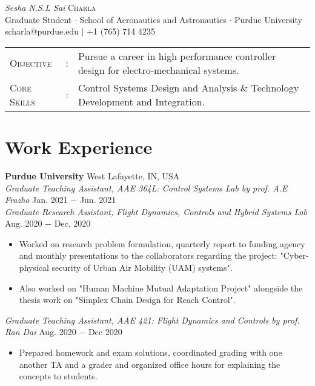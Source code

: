 \documentclass[letterpaper,10pt]{article}
\begin{document}
\begin{center}
\thispagestyle{empty}
\huge{\textit{Sesha N.S.L Sai} \textsc{Charla}}\\
\small Graduate Student $\cdot$ School of Aeronautics and Astronautics $\cdot$ Purdue University\\
\small scharla@purdue.edu $\mid$ +1 (765) 714 4235   \\
\end{center}



\begin{tabular}{l c l}
    {\large{\textsc{Objective}}}&:& Pursue a career in high performance controller design for electro-mechanical systems.\\
	{\large{\textsc{Core Skills}}}&:& Control Systems Design and Analysis \& Technology Development and Integration. %
\end{tabular}


\section{Work Experience}
\noindent \textbf{Purdue University} \hfill West Lafayette, IN, USA \\
\noindent \textit{Graduate Teaching Assistant, AAE 364L: Control Systems Lab by prof. A.E Frazho} \hfill Jan. 2021 $-$ Jun. 2021\\
\vspace{3pt}
\noindent \textit{Graduate Research Assistant, Flight Dynamics, Controls and Hybrid Systems Lab} \hfill Aug. 2020 $-$ Dec. 2020
\begin{itemize}[noitemsep,nolistsep,leftmargin=0.25in,label={--}]
    \item Worked on research problem formulation, quarterly report to funding agency and monthly presentations to the collaborators regarding the project: "Cyber-physical security of Urban Air Mobility (UAM) systems".
	 \item Also worked on "Human Machine Mutual Adaptation Project" alongside the thesis work on "Simplex Chain Design for Reach Control".
\end{itemize}
\vspace{3pt}
\noindent \textit{Graduate Teaching Assistant, AAE 421: Flight Dynamics and Controls by prof. Ran Dai} \hfill Aug. 2020 $-$ Dec 2020
\begin{itemize}[noitemsep,nolistsep,leftmargin=0.25in,label={--}]
    \item Prepared homework and exam solutions, coordinated grading with one another TA and a grader and organized office hours for explaining the concepts to students.
\end{itemize}
\end{document}
